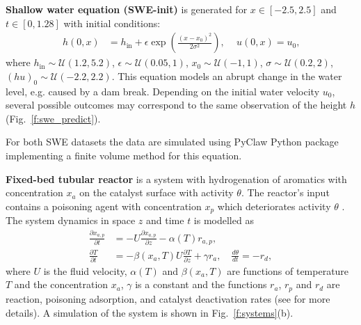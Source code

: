 \documentclass{article}
\newcommand{\dd}[2]{\frac{\partial #1} {\partial #2}}
\newcommand{\xa}{x_a}
\newcommand{\xp}{x_p}
\newcommand{\xap}{x_{a,p}}
\newcommand{\cat}{\theta}
\newcommand{\Ra}{r_a}
\newcommand{\Rap}{r_{a,p}}
\newcommand{\Rp}{r_p}
\begin{document}
\textbf{Shallow water equation (SWE-init)} is generated for $x \in [-2.5, 2.5]$ and $t \in [0, 1.28]$ with initial conditions:
\begin{align}
    h(0, x) &= h_\text{in} + \epsilon \exp\left(\frac{(x - x_0)^2}{2 \sigma^2}\right) \text{, } \quad
    u(0, x) = u_0 \text{,}
    \label{eq:swe_ic}
\end{align}
where $h_\text{in} \sim \mathcal{U}\left(1.2, 5.2\right)$, $\epsilon \sim \mathcal{U}\left(0.05, 1\right)$, $x_0 \sim \mathcal{U}\left(-1, 1\right)$, $\sigma \sim \mathcal{U}\left(0.2, 2\right)$,  $(hu)_0 \sim \mathcal{U}\left(-2.2, 2.2\right)$. This equation models an abrupt change in the water level, e.g. caused by a dam break. Depending on the initial water velocity $u_0$, several possible outcomes may correspond to the same observation of the height $h$ (Fig.~\ref{f:swe_predict}).

For both SWE datasets the data are simulated using PyClaw \cite{ketcheson2012pyclaw} Python package implementing a finite volume method for this equation. 


\textbf{Fixed-bed tubular reactor} is a system with hydrogenation of aromatics with concentration $\xa$ on the catalyst surface with activity $\cat$. The reactor's input contains a poisoning agent with concentration $\xp$ which deteriorates activity $\cat$ \cite{price1977catalyst}. The system dynamics in space $z$ and time $t$ is modelled as
\begin{align} 
\dd{\xap}{t} &= -U \dd{\xap}{z} - \alpha(T) \Rap, \\
\dd{T}{t} &= - \beta(\xa, T) U \dd{T}{z} + \gamma \Ra, \quad
\frac{d \theta}{dt} = -r_d,
\label{eq:reactor}
\end{align}
where $U$ is the fluid velocity, $\alpha(T)$ and $\beta(\xa, T)$ are functions of temperature $T$ and the concentration $\xa$, $\gamma$ is a constant and the functions $\Ra$, $\Rp$ and $r_d$ are reaction, poisoning adsorption, and catalyst deactivation rates (see \cite{haitsiukevich2021agrid} for more details). A simulation of the system is shown in Fig.~\ref{f:systems}(b).
\end{document}
